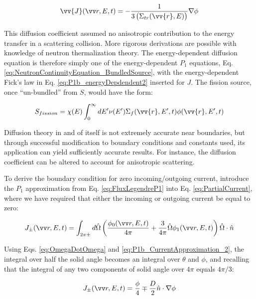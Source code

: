 \begin{equation}
\label{eq:P1b_energyDepdendent2}
\vv{J}\spas = -\frac{1}{3\left(\Sigma_{tr}(\vv{r},E)\right)}\nabla\phi
\end{equation}

This diffusion coefficient assumed no anisotropic contribution to the energy transfer in a scattering collision. More rigorous derivations are possible with knowledge of neutron thermalization theory. The energy-dependent diffusion equation is therefore simply one of the energy-dependent \(P_1\) equations, Eq. \ref{eq:NeutronContinuityEquation_BundledSource}, with the energy-dependent Fick's law in Eq. \ref{eq:P1b_energyDepdendent2} inserted for \(J\). The fission source, once ``un-bundled'' from \(S\), would have the form:

\begin{equation}
\label{eq:FissionSource}
S_{fission}=\chi(E)\int_{0}^{\infty}dE'\nu(E')\Sigma_f(\vv{r}, E', t)\phi(\vv{r}, E', t)
\end{equation}

Diffusion theory in and of itself is not extremely accurate near boundaries, but through successful modification to boundary conditions and constants used, its application can yield sufficiently accurate results. For instance, the diffusion coefficient can be altered to account for anisotropic scattering. 

To derive the boundary condition for zero incoming/outgoing current, introduce the \(P_1\) approximation from Eq. \ref{eq:FluxLegendreP1} into Eq. \ref{eq:PartialCurrent}, where we have required that either the incoming or outgoing current be equal to zero:

\begin{equation}
\label{eq:PartialCurrent_BC1}
J_\pm \spas = \int_{2\pi\pm}^{} d\hO   \left(\frac{\phi_0\spas}{4\pi} + \frac{3}{4\pi} \hO  \phi_1\spas\right)\hO  \cdot\hat{n}
\end{equation}

Using Eqs. \ref{eq:OmegaDotOmega} and \ref{eq:P1b_CurrentApproximation_2}, the integral over half the solid angle becomes an integral over \(\theta\) and \(\phi\), and recalling that the integral of any two components of solid angle over \(4\pi\) equals \(4\pi/3\):

\begin{equation}
\label{eq:PartialCurrent_BC2}
J_\pm \spas = \frac{\phi}{4} \mp \frac{D}{2}\hat{n}\cdot\nabla\phi
\end{equation}

